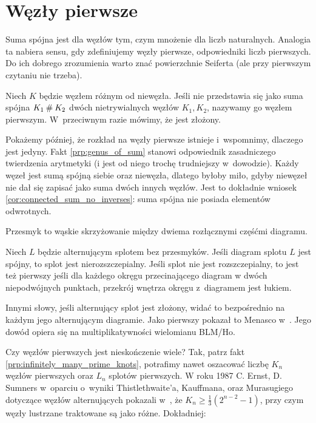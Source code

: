 \section{Węzły pierwsze}
%
Suma spójna jest dla węzłów tym, czym mnożenie dla liczb naturalnych.
Analogia ta nabiera sensu, gdy zdefiniujemy węzły pierwsze, odpowiedniki liczb pierwszych.
Do ich dobrego zrozumienia warto znać powierzchnie Seiferta (ale przy pierwszym czytaniu nie trzeba).

\begin{definition}
\label{def:prime_knot}%
    Niech $K$ będzie węzłem różnym od niewęzła.
    Jeśli nie przedstawia się jako suma spójna $K_1 \mathbin{\#} K_2$
    dwóch nietrywialnych węzłów $K_1, K_2$, nazywamy go węzłem pierwszym.
    W~przeciwnym razie mówimy, że jest złożony.
\end{definition}

Pokażemy później, że rozkład na węzły pierwsze istnieje i~wspomnimy, dlaczego jest jedyny.
Fakt \ref{prp:genus_of_sum} stanowi odpowiednik zasadniczego twierdzenia arytmetyki (i jest od niego trochę trudniejszy w~dowodzie).
Każdy węzeł jest sumą spójną siebie oraz niewęzła, dlatego byłoby miło, gdyby niewęzeł nie dał się zapisać jako suma dwóch innych węzłów.
Jest to dokładnie wniosek \ref{cor:connected_sum_no_inverses}: suma spójna nie posiada elementów odwrotnych.


Przesmyk to wąskie skrzyżowanie między dwiema rozłącznymi częśćmi diagramu.

\begin{proposition}
%
    Niech $L$ będzie alternującym splotem bez przesmyków.
    Jeśli diagram splotu $L$ jest spójny, to splot jest nierozszczepialny.
    Jeśli splot nie jest rozszczepialny, to jest też pierwszy jeśli dla każdego okręgu przecinającego diagram w dwóch niepodwójnych punktach, przekrój wnętrza okręgu z~diagramem jest łukiem.
\end{proposition}

Innymi słowy, jeśli alternujący splot jest złożony, widać to bezpośrednio na każdym jego alternującym diagramie.
Jako pierwszy pokazał to Menasco w~\cite{menasco84}.
Jego dowód opiera się na multiplikatywności wielomianu BLM/Ho.

Czy węzłów pierwszych jest nieskończenie wiele?
Tak, patrz fakt \ref{prp:infinitely_many_prime_knots}, potrafimy nawet oszacować liczbę $K_n$ węzłów pierwszych oraz $L_n$ splotów pierwszych.
W roku 1987 C. Ernst, D. Sumners w~oparciu o~wyniki Thistlethwaite'a, Kauffmana, oraz Murasugiego dotyczące węzłów alternujących pokazali w~\cite{ernst87}, że $K_n \ge \frac 1 3 (2^{n- 2} - 1)$, przy czym węzły lustrzane traktowane są jako różne.
Dokładniej:

